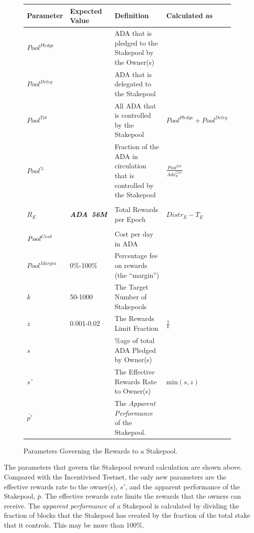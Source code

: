 \documentclass[11pt,a4paper,dvipsnames,twosided,final]{article}
\newcommand{\ada}{ADA{}}
\newcommand{\ADA}[1]{\textbf{\emph{\ada~{#1}}}}
\begin{document}
\begin{figure}[h!]
\begin{center}
\begin{tabular}{||l|l|p{6cm}|l||}
  \hline \hline
\textbf{Parameter} & \textbf{Expected Value} & \textbf{Definition} & \textbf{Calculated as} \\\hline
{\color{red} ${Pool}^\textit{Pledge}$} & & {\color{red} \ada{} that is pledged to the Stakepool by the Owner(s)} & \\\hline
{\color{blue} ${\textit{Pool}}^\textit{Deleg}$} & & {\color{blue} \ada{} that is delegated to the Stakepool} & \\\hline
${\textit{Pool}}^{Tot}$ & & All \ada{} that is controlled by the Stakepool & ${\textit{Pool}}^\textit{Pledge} + {\textit{Pool}}^\textit{Deleg}$ \\\hline
  ${\textit{Pool}}^\%$ & & Fraction of the \ada{} in circulation that is controlled by the Stakepool & {\large $\frac{{\textit{Pool}}^{Tot}}{\textit{Ada}^{\textit{Circ}}_E}$} \\\hline
&&&  \\\hline
$R_E$ & \ADA{56M} & Total Rewards per Epoch & ${\textit{Distr}}_E - T_E$ \\\hline
&&&  \\\hline
{\color{red} $\textit{\textit{Pool}}^{\textit{Cost}}$} &  & {\color{red} Cost per day in \ada{}} & \\\hline
{\color{red} ${\textit{Pool}}^{\textit{Margin}}$} &  {\color{red} 0\%-100\%} & {\color{red} Percentage fee on rewards (the ``margin'')} & \\\hline
\emph{k} & 50-1000 & The Target Number of Stakepools & \\\hline
\emph{z} & 0.001-0.02 & The Rewards Limit Fraction & $\frac{1}{k}$ \\\hline
\emph{s} & & \%age of total ADA Pledged by Owner(s) & \\\hline
\emph{s'} & & The Effective Rewards Rate to Owner(s) & $\textrm{min} (s,z)$\\\hline
$\bar{p'}$ & & The \emph{Apparent Performance} of the Stakepool. & \\\hline
  \hline
\end{tabular}
\end{center}
\caption{Parameters Governing the Rewards to a Stakepool.}
\label{fig:rewards}
\end{figure}

\noindent
The parameters that govern the Stakepool reward calculation are shown above.  Compared with the Incentivised
Testnet, the only new parameters are the effective rewards rate to the owner(s), $s'$, and the apparent performance of the Stakepool, $\bar{p}$.
The effective rewards rate limits the rewards that the owners can receive.  The \emph{apparent performance} of a Stakepool is calculated
by dividing the fraction of blocks that the Stakepool has created by the fraction of the total stake that it controls.  This may be more than 100\%.
\end{document}
